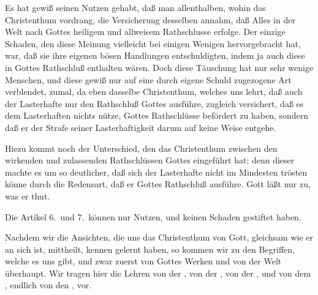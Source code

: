 \begin{aufza}
\item Es hat gewiß seinen Nutzen gehabt, daß man allenthalben, wohin das Christenthum vordrang, die Versicherung desselben annahm, daß Alles in der Welt nach Gottes heiligem und allweisem Rathschlusse erfolge. Der einzige Schaden, den diese Meinung vielleicht bei einigen Wenigen hervorgebracht hat, war, daß sie ihre eigenen bösen Handlungen entschuldigten, indem ja auch diese in Gottes Rathschluß enthalten wären. Doch diese Täuschung hat nur sehr wenige Menschen, und diese gewiß nur auf eine durch eigene Schuld zugezogene Art verblendet, zumal, da eben dasselbe Christenthum, welches uns lehrt, daß auch der Lasterhafte nur den Rathschluß Gottes ausführe, zugleich versichert, daß es dem Lasterhaften nichts nütze, Gottes Rathschlüsse befördert zu haben, sondern daß er der Strafe seiner Lasterhaftigkeit darum auf keine Weise entgehe.~
\item Hiezu kommt noch der Unterschied, den das Christenthum zwischen den wirkenden und zulassenden Rathschlüssen Gottes eingeführt hat; denn dieser machte es um so deutlicher, daß sich der Lasterhafte nicht im Mindesten trösten könne durch die Redensart, daß er Gottes Rathschluß ausführe. Gott läßt nur zu, was er thut.
\end{aufza}

Die Artikel 6.\ und 7.\ können nur Nutzen, und keinen Schaden gestiftet haben.

Nachdem wir die Ansichten, die uns das Christenthum von Gott, gleichsam wie er an sich ist, mittheilt, kennen gelernt haben, so kommen wir zu den Begriffen, welche es uns  gibt, und zwar zuerst von Gottes Werken  und von der Welt überhaupt. Wir tragen hier die Lehren von der , von der , von der , und von dem , endlich von den , vor.

